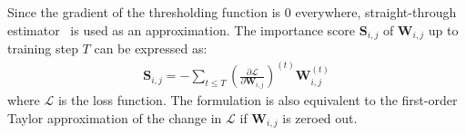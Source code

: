 Since the gradient of the thresholding function is 0 everywhere, straight-through estimator~\cite{st} is used as an approximation. The importance score $\bm{S}_{i,j}$ of $\bm{W}_{i,j}$ up to training step $T$ can be expressed as: 
\begin{align}
\bm{S}_{i,j}=-\sum_{t\le T}(\frac{\partial \mathcal{L}}{\partial \bm{W}_{i,j}})^{(t)} \bm{W}_{i,j}^{(t)}
\end{align}
where $\mathcal{L}$ is the loss function. The formulation is also equivalent to the first-order Taylor approximation of the change in $\mathcal{L}$ if $\bm{W}_{i,j}$ is zeroed out.


